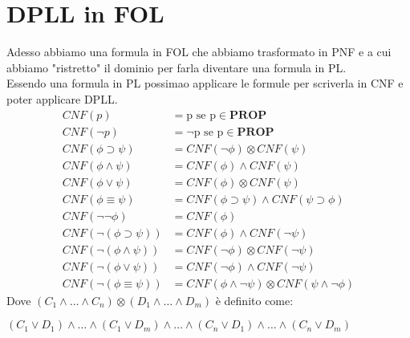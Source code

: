 \documentclass[../main.tex]{subfiles}
\begin{document}
   \section{DPLL in FOL}
   Adesso abbiamo una formula in FOL che abbiamo trasformato in PNF e a cui abbiamo "ristretto" il dominio per farla diventare una formula in PL.\\
   Essendo una formula in PL possimao applicare le formule per scriverla in CNF e poter applicare DPLL.
   \begin{align*}
      CNF(p)&=\text{p se p} \in \textbf{PROP}\\
      CNF(\lnot p) &=\text{$\lnot$p se p} \in \textbf{PROP}\\
      CNF(\phi \supset \psi) &= CNF(\lnot \phi) \otimes CNF(\psi)\\
      CNF(\phi \land \psi) &= CNF(\phi) \land CNF(\psi)\\
      CNF(\phi \lor \psi) &= CNF(\phi) \otimes CNF(\psi)\\
      CNF(\phi \equiv \psi) &= CNF(\phi \supset \psi) \land CNF(\psi \supset \phi)\\
      CNF(\lnot \lnot \phi) &= CNF(\phi)\\
      CNF(\lnot (\phi \supset \psi)) &= CNF(\phi) \land CNF(\lnot \psi)\\
      CNF(\lnot (\phi \land \psi)) &= CNF(\lnot \phi) \otimes CNF(\lnot \psi)\\
      CNF(\lnot (\phi \lor \psi)) &= CNF(\lnot \phi) \land CNF(\lnot \psi)\\
      CNF(\lnot (\phi \equiv \psi)) &= CNF(\phi \land \lnot \psi) \otimes CNF(\psi \land \lnot \phi)
   \end{align*}
  Dove $(C_1 \land \dots \land C_n) \otimes (D_1 \land \dots \land D_m)$ è definito come:
  \begin{center}
      $(C_1 \lor D_1) \land \dots \land(C_1 \lor D_m) \land \dots \land(C_n \lor D_1) \land \dots \land(C_n \lor D_m)$
  \end{center}
\end{document}

